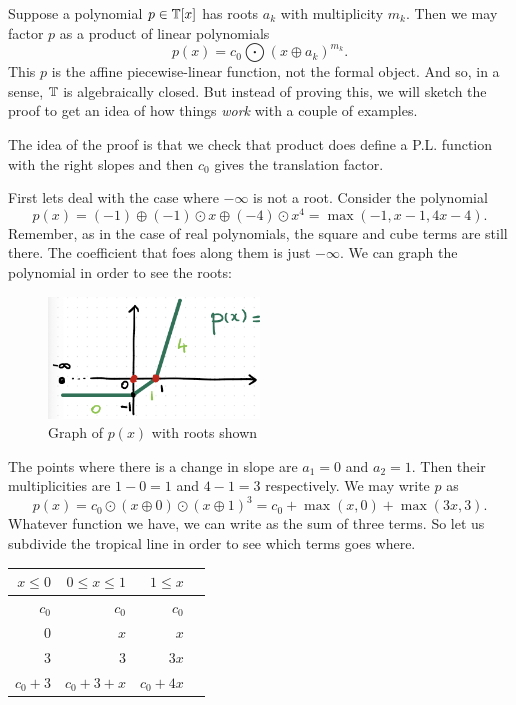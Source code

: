 \documentclass[12pt]{memoir}
\begin{document}
Suppose a polynomial $p\in\mathbb{T}[x]$ has roots $a_k$ with multiplicity $m_k$. Then we may factor $p$ as a product of linear polynomials 
$$p(x)=c_0\bigodot(x\oplus a_k)^{m_k}.$$
This $p$ is the affine piecewise-linear function, not the formal object. And so, in a sense, $\mathbb{T}$ is algebraically closed. But instead of proving this, we will sketch the proof to get an idea of how things \emph{work} with a couple of examples.\par 
The idea of the proof is that we check that product does define a P.L. function with the right slopes and then $c_0$ gives the translation factor.
\begin{Ex}
First lets deal with the case where $-\infty$ is not a root. Consider the polynomial 
$$p(x)=(-1)\oplus(-1)\odot x\oplus(-4)\odot x^4=\max(-1,x-1,4x-4).$$
Remember, as in the case of real polynomials, the square and cube terms are still there. The coefficient that foes along them is just $-\infty$. We can graph the polynomial in order to see the roots:
\begin{figure}[h!]
    \centering
    \includegraphics[width=0.5\textwidth]{figs/fig4-1-InfinityNotRoot.png}
    \caption{Graph of $p(x)$ with roots shown}
    \label{fig:4.1-InfinityNotRoot}
\end{figure}
The points where there is a change in slope are $a_1=0$ and $a_2=1$. Then their multiplicities are $1-0=1$ and $4-1=3$ respectively. We may write $p$ as 
$$p(x)=c_0\odot(x\oplus 0)\odot(x\oplus 1)^{3}=c_0+\max(x,0)+\max(3x,3).$$
Whatever function we have, we can write as the sum of three terms. So let us subdivide the tropical line in order to see which terms goes where.
\begin{table}[h!]
    \centering
    \begin{tabular}{rrrr}\toprule
        $x\leq 0$ & $0\leq x\leq 1$ & $1\leq x$\\ \midrule
        $c_0$& $c_0$&$c_0$\\
        $0$&$x$ & $x$\\
        $3$& $3$ & $3x$\\ \midrule
        $c_0+3$&$c_0+3+x$&$c_0+4x$\\

\end{tabular}
\end{table}
\end{Ex}
\end{document}
